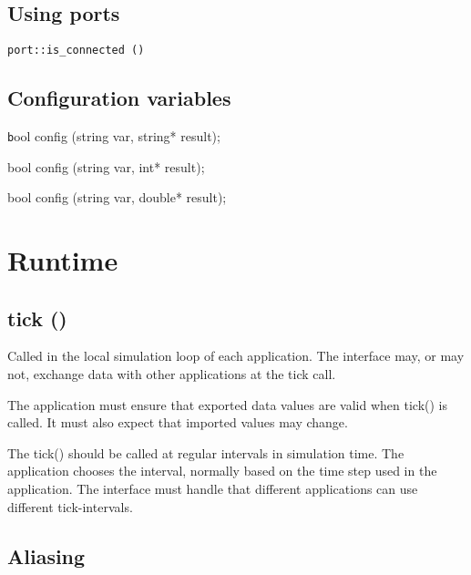 \documentclass[a4paper]{report}
\newenvironment{head}%
{\texttt}%
{}
\newenvironment{code}%
{\texttt}%
{}
\begin{document}
\begin{code}
\end{code}

\subsection{Using ports}

\begin{head}
\verb|port::is_connected ()|
\end{head}

\begin{code}
\end{code}

\subsection{Configuration variables}

\begin{head}
    bool config (string var, string* result);

    bool config (string var, int* result);

    bool config (string var, double* result);
\end{head}

\begin{code}
\end{code}

\section{Runtime}

\subsection{tick ()}

Called in the local simulation loop of each application.
The interface may, or may not, exchange data with other applications
at the tick call.

The application must ensure that exported data values are valid when
tick() is called.  It must also expect that imported values may change.

The tick() should be called at regular intervals in simulation time.
The application chooses the interval, normally based on the time step
used in the application.  The interface must handle that different
applications can use different tick-intervals.


\subsection{Aliasing}
\end{document}
